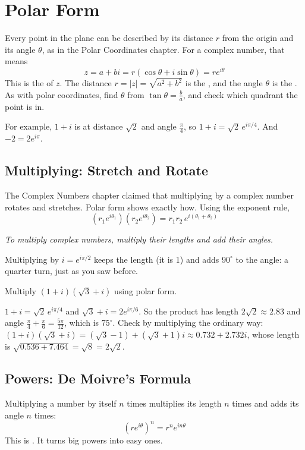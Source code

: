 \section{Polar Form}
Every point in the plane can be described by its distance $r$ from the origin and
its angle $\theta$, as in the Polar Coordinates chapter. For a complex number, that
means
$$z = a + bi = r(\cos\theta + i\sin\theta) = re^{i\theta}$$
This is the  of $z$. The distance $r = |z| = \sqrt{a^2 + b^2}$ is
the , and the angle $\theta$ is the . As with
polar coordinates, find $\theta$ from $\tan\theta = \frac{b}{a}$, and check which
quadrant the point is in.

For example, $1 + i$ is at distance $\sqrt{2}$ and angle $\frac{\pi}{4}$, so
$1 + i = \sqrt{2}\,e^{i\pi/4}$. And $-2 = 2e^{i\pi}$.

\subsection{Multiplying: Stretch and Rotate}
The Complex Numbers chapter claimed that multiplying by a complex number rotates
and stretches. Polar form shows exactly how. Using the exponent rule,
$$\left(r_1 e^{i\theta_1}\right)\left(r_2 e^{i\theta_2}\right) = r_1 r_2\, e^{i(\theta_1 + \theta_2)}$$
\begin{center}
\emph{To multiply complex numbers, multiply their lengths and add their angles.}
\end{center}
Multiplying by $i = e^{i\pi/2}$ keeps the length (it is 1) and adds $90^\circ$ to
the angle: a quarter turn, just as you saw before.

\begin{Worked}
\begin{Problem}
Multiply $(1 + i)(\sqrt{3} + i)$ using polar form.
\end{Problem}
\begin{Solution}
$1 + i = \sqrt{2}\,e^{i\pi/4}$ and $\sqrt{3} + i = 2e^{i\pi/6}$. So the
product has length $2\sqrt{2} \approx 2.83$ and angle
$\frac{\pi}{4} + \frac{\pi}{6} = \frac{5\pi}{12}$, which is $75^\circ$. Check by
multiplying the ordinary way: $(1 + i)(\sqrt{3} + i) = (\sqrt{3} - 1) + (\sqrt{3} + 1)i
\approx 0.732 + 2.732i$, whose length is $\sqrt{0.536 + 7.464} = \sqrt{8} = 2\sqrt{2}$.
\end{Solution}
\end{Worked}

\subsection{Powers: De Moivre's Formula}
Multiplying a number by itself $n$ times multiplies its length $n$ times and adds
its angle $n$ times:
$$\left(re^{i\theta}\right)^n = r^n e^{in\theta}$$
This is . It turns big powers into easy ones.

